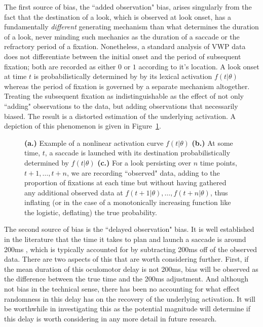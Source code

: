 The first source of bias, the ``added observation" bias, arises singularly from the fact that the destination of a look, which is observed at look onset, has a fundamentally \textit{different} generating mechanism than what determines the duration of a look, never minding such mechanics as the duration of a saccade or the refractory period of a fixation. Nonetheless, a standard analysis of VWP data does not differentiate between the initial onset and the period of subsequent fixation; both are recorded as either $0$ or $1$ according to it's location. A look onset at time $t$ is probabilistically determined by by its lexical activation $f(t|\theta)$ whereas the period of fixation is governed by a separate mechanism altogether. Treating the subsequent fixation as indistinguishable as the effect of not only ``adding" observations to the data, but adding observations that necessarily biased. The result is a distorted estimation of the underlying activation. A depiction of this phenomenon is given in Figure~\ref{fig:folly_of_fixation}. 


\begin{figure}[H]
    \centering
    \caption{ \textbf{(a.)} Example of a nonlinear activation curve $f(t|\theta)$ \textbf{(b.)} At some time, $t$, a saccade is launched with its destination probabilistically determined by $f(t|\theta)$ \textbf{(c.)} For a look persisting over $n$ time points, $t+1, \dots, t+n$, we are recording ``observed" data, adding to the proportion of fixations at each time but without having gathered any additional observed data at $f(t+1 | \theta), \dots,f(t+n | \theta)$, thus inflating (or in the case of a monotonically increasing function like the logistic, deflating) the true probability. }
\label{fig:folly_of_fixation}
\end{figure}

The second source of bias is the ``delayed observation" bias. It is well established in the literature that the time it takes to plan and launch a saccade is around 200ms \cite{viviani1990time}, which is typically accounted for by subtracting 200ms off of the observed data. There are two aspects of this that are worth considering further. First, if the mean duration of this oculomotor delay is not 200ms, bias will be observed as the difference between the true time and the 200ms adjustment. And although not bias in the technical sense, there has been no accounting for what effect randomness in this delay has on the recovery of the underlying activation. It will be worthwhile in investigating this as the potential magnitude will determine if this delay is worth considering in any more detail in future research.

